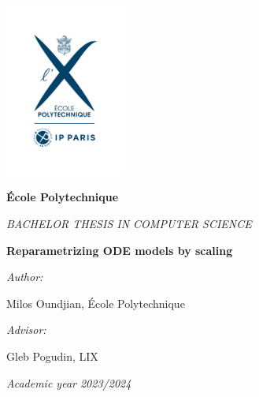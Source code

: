 \documentclass[oneside, a4paper, onecolumn, 11pt]{article}
\newcommand{\thesistitle}[0]{Reparametrizing ODE models by scaling}
\newcommand{\authorname}[0]{Milos Oundjian}
\newcommand{\supervisor}[0]{Gleb Pogudin}
\newcommand{\supervisorinstitution}[0]{LIX}
\begin{document}



\hspace{0pt}
\vfill

\begin{center}

\includegraphics[width=0.3\textwidth]{logo-EP-vertical}

\vspace*{2em}
%
{\large
\textbf{\'Ecole Polytechnique}

\vspace*{1em}
\textit{BACHELOR THESIS IN COMPUTER SCIENCE}


\vspace*{3em}
{\Huge \textbf{\thesistitle}}
\vspace*{3em}



\textit{Author:}

\vspace*{1em}
\authorname{}, \'Ecole Polytechnique

\vspace*{2em}
%
{\textit{Advisor:}}

\vspace*{1em}
\supervisor{}, \supervisorinstitution{}
}

\vspace*{2em}
\textit{Academic year 2023/2024}

\end{center}

\vfill
\hspace{0pt}
\end{document}
